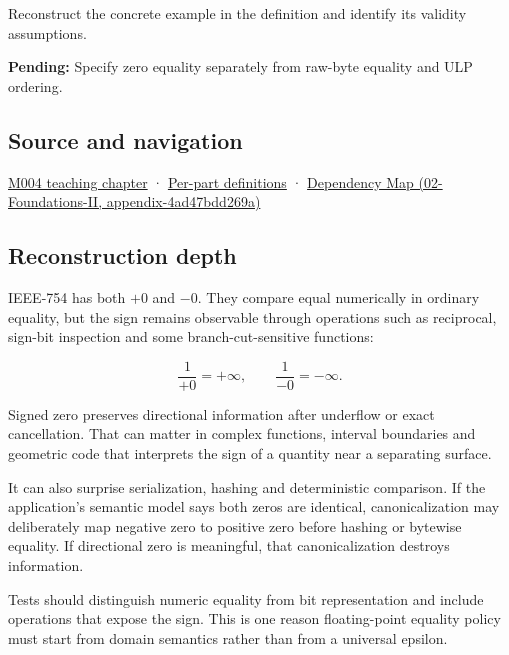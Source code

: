 Reconstruct the concrete example in the definition and identify its validity assumptions.

\textbf{Pending:} Specify zero equality separately from raw-byte equality and ULP ordering.

\subsection{Source and navigation}\label{appendix-3a048f032c1f-source-and-navigation}

\hyperref[01-foundations-i-ch001-a-stretching-ruler-for-real-valued-quantities]{M004 teaching chapter} · \hyperref[appendix-fd090d982a15-m004---parts-61-76]{Per-part definitions} · \href{../02-Foundations-II/main.pdf\#nameddest=appendix-4ad47bdd269a}{Dependency Map (02-Foundations-II, appendix-4ad47bdd269a)}

\subsection{Reconstruction depth}\label{appendix-3a048f032c1f-reconstruction-depth}

IEEE-754 has both \(+0\) and \(-0\). They compare equal numerically in ordinary equality, but the sign remains observable through operations such as reciprocal, sign-bit inspection and some branch-cut-sensitive functions:

\[
\frac{1}{+0}=+\infty,
\qquad
\frac{1}{-0}=-\infty.
\]

Signed zero preserves directional information after underflow or exact cancellation. That can matter in complex functions, interval boundaries and geometric code that interprets the sign of a quantity near a separating surface.

It can also surprise serialization, hashing and deterministic comparison. If the application's semantic model says both zeros are identical, canonicalization may deliberately map negative zero to positive zero before hashing or bytewise equality. If directional zero is meaningful, that canonicalization destroys information.

Tests should distinguish numeric equality from bit representation and include operations that expose the sign. This is one reason floating-point equality policy must start from domain semantics rather than from a universal epsilon.
